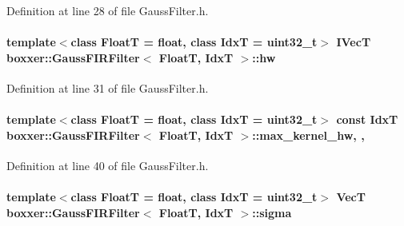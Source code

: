 Definition at line 28 of file Gauss\+Filter.\+h.

\paragraph[{\texorpdfstring{hw}{hw}}]{\setlength{\rightskip}{0pt plus 5cm}template$<$class FloatT = float, class IdxT = uint32\+\_\+t$>$ {\bf I\+VecT} {\bf boxxer\+::\+Gauss\+F\+I\+R\+Filter}$<$ FloatT, IdxT $>$\+::hw\hspace{0.3cm}{\ttfamily [inherited]}}\hypertarget{classboxxer_1_1GaussFIRFilter_ae17a4e137303e452a9223ba34825e0da}{}\label{classboxxer_1_1GaussFIRFilter_ae17a4e137303e452a9223ba34825e0da}


Definition at line 31 of file Gauss\+Filter.\+h.

\paragraph[{\texorpdfstring{max\+\_\+kernel\+\_\+hw}{max_kernel_hw}}]{\setlength{\rightskip}{0pt plus 5cm}template$<$class FloatT = float, class IdxT = uint32\+\_\+t$>$ const IdxT {\bf boxxer\+::\+Gauss\+F\+I\+R\+Filter}$<$ FloatT, IdxT $>$\+::max\+\_\+kernel\+\_\+hw\hspace{0.3cm}{\ttfamily [static]}, {\ttfamily [protected]}, {\ttfamily [inherited]}}\hypertarget{classboxxer_1_1GaussFIRFilter_a7f85e018f78753ee4fedf65c04b0c65a}{}\label{classboxxer_1_1GaussFIRFilter_a7f85e018f78753ee4fedf65c04b0c65a}


Definition at line 40 of file Gauss\+Filter.\+h.

\paragraph[{\texorpdfstring{sigma}{sigma}}]{\setlength{\rightskip}{0pt plus 5cm}template$<$class FloatT = float, class IdxT = uint32\+\_\+t$>$ {\bf VecT} {\bf boxxer\+::\+Gauss\+F\+I\+R\+Filter}$<$ FloatT, IdxT $>$\+::sigma\hspace{0.3cm}{\ttfamily [inherited]}}\hypertarget{classboxxer_1_1GaussFIRFilter_a66ced06c688fd544d5f1f8be39aa2125}{}\label{classboxxer_1_1GaussFIRFilter_a66ced06c688fd544d5f1f8be39aa2125}


